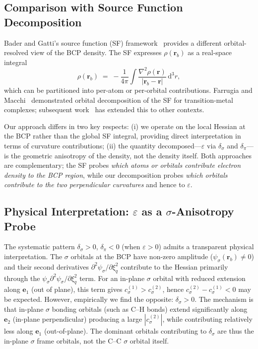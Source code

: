 \documentclass[11pt,a4paper]{article}
\newcommand{\delsg}{\delta_{\sigma}}
\newcommand{\delpi}{\delta_{\pi}}
\newcommand{\eps}{\varepsilon}
\begin{document}
\subsection{Comparison with Source Function Decomposition}

Bader and Gatti's source function (SF) framework~\citep{BaderGatti1998}
provides a different orbital-resolved view of the BCP density. The SF
expresses $\rho(\mathbf{r}_b)$ as a real-space integral
\begin{equation}
\rho(\mathbf{r}_b)
\;=\;
-\frac{1}{4\pi} \int \frac{\nabla^2 \rho(\mathbf{r})}
                          {|\mathbf{r}_b - \mathbf{r}|}\,
\mathrm{d}^3 r,
\label{eq:sf}
\end{equation}
which can be partitioned into per-atom or per-orbital contributions.
Farrugia and Macchi~\citep{Farrugia2009} demonstrated orbital
decomposition of the SF for transition-metal complexes; subsequent
work~\citep{Monza2011,Baggioli2018} has extended this to other
contexts.

Our approach differs in two key respects: (i) we operate on the local
Hessian at the BCP rather than the global SF integral, providing
direct interpretation in terms of curvature contributions; (ii) the
quantity decomposed---$\eps$ via $\delsg$ and $\delpi$---is the
geometric anisotropy of the density, not the density itself. Both
approaches are complementary; the SF probes \emph{which atoms or
orbitals contribute electron density to the BCP region}, while
our decomposition probes \emph{which orbitals contribute to the
two perpendicular curvatures} and hence to $\eps$.

\subsection{Physical Interpretation: $\eps$ as a $\sigma$-Anisotropy Probe}

The systematic pattern $\delsg > 0$, $\delpi < 0$ (when $\eps > 0$)
admits a transparent physical interpretation. The
$\sigma$ orbitals at the BCP have non-zero amplitude
($\psi_\sigma(\mathbf{r}_b) \ne 0$) and their second derivatives
$\partial^2 \psi_\sigma / \partial \xi_q^2$ contribute to the
Hessian primarily through the
$\psi_\sigma \partial^2 \psi_\sigma / \partial \xi_q^2$ term.
For an in-plane $\sigma$ orbital with reduced extension along
$\mathbf{e}_1$ (out of plane), this term gives
$c_\sigma^{(1)} > c_\sigma^{(2)}$, hence
$c_\sigma^{(2)} - c_\sigma^{(1)} < 0$ may be expected. However,
empirically we find the opposite: $\delsg > 0$. The mechanism is
that in-plane $\sigma$ bonding orbitals (such as C--H bonds) extend
significantly along $\mathbf{e}_2$ (in-plane perpendicular)
producing a large $|c_\sigma^{(2)}|$, while contributing relatively
less along $\mathbf{e}_1$ (out-of-plane). The dominant orbitals
contributing to $\delsg$ are thus the in-plane $\sigma$ frame
orbitals, not the C--C $\sigma$ orbital itself.
\end{document}
